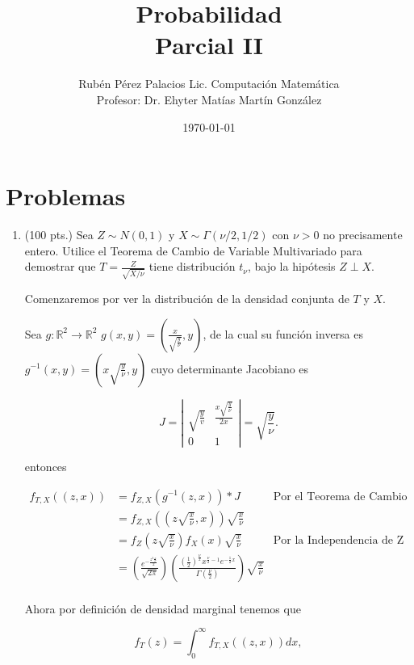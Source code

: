 \documentclass[letterpaper]{article}
\title{Probabilidad \\Parcial II}
\author{Rubén Pérez Palacios Lic. Computación Matemática\\Profesor: Dr. Ehyter Matías Martín González}
\date{\today}
\theoremstyle{definition}
\theoremstyle{lemathm}
\theoremstyle{lemathm}
\theoremstyle{lemademthm}
\newcommand{\abs}[1]{\left| #1 \right| }
\newcommand{\pars}[1]{\left( #1 \right) }
\newcommand{\R}{\mathbb{R}}
\newcommand{\1}{\mathbbm{1}}
\begin{document}
	\maketitle
    
    \section*{Problemas}

    \begin{enumerate}
        
		\item (100 pts.) Sea $Z\sim N(0,1)$ y $X\sim\Gamma( \nu/2,1/2)$ con $\nu>0$ no precisamente entero. Utilice el Teorema de Cambio de Variable Multivariado para demostrar que $T=\frac{Z}{\sqrt{X/\nu}}$ tiene distribución $t_\nu$, bajo la hipótesis $Z\perp X$.
		
		Comenzaremos por ver la distribución de la densidad conjunta de $T$ y $X$. 
		
		Sea $g: \R^2\to\R^2$ $g(x,y) = \pars{\frac{x}{\sqrt{\frac{y}{\nu}}}, y}$, de la cual su función inversa es $g^{-1}(x,y) = \pars{x\sqrt{\frac{y}{\nu}}, y}$ cuyo determinante Jacobiano es
		
		\[J = \abs{\begin{array}{cc}
			\sqrt{\frac{y}{v}} & \frac{x\sqrt{\frac{y}{\nu}}}{2x}\\
			0 & 1
		\end{array}} = \sqrt{\frac{y}{\nu}}.\]

		entonces

		\begin{align*}
			f_{T,X}((z,x)) &= f_{Z,X}(g^{-1}(z,x)) * J &\text{Por el Teorema de Cambio de Variable Multivariado}\\
			&= f_{Z,X}\pars{\pars{z\sqrt{\frac{x}{\nu}},x}} \sqrt{\frac{x}{\nu}}\\
			&= f_{Z}\pars{z\sqrt{\frac{x}{\nu}}}f_{X}(x) \sqrt{\frac{x}{\nu}} & \text{Por la Independencia de Z y X}\\
			&= \pars{\frac{e^{-\frac{z^2\frac{x}{\nu}}{2}}}{\sqrt{2\pi}}} \pars{\frac{\pars{\frac{1}{2}}^{\frac{\nu}{2}} x^{\frac{\nu}{2}-1} e^{-\frac{1}{2}x}}{\Gamma\pars{\frac{\nu}{2}}}} \sqrt{\frac{x}{\nu}}\\
		\end{align*}

		Ahora por definición de densidad marginal tenemos que

		\[f_T(z) = \int_{0}^{\infty} f_{T,X}((z,x)) dx,\]

		\newpage


\end{enumerate}
\end{document}
